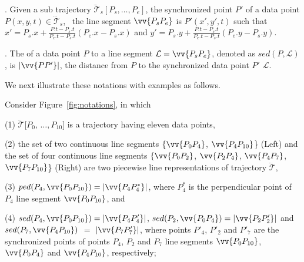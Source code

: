 . Given a sub trajectory $\dddot{\mathcal{T}}_s[P_s, \ldots, P_e]$, the synchronized point $P'$ of a data point  $P(x, y, t) \in \dddot{\mathcal{T}}_s$, ~\wrt the line segment $\vv{P_sP_e}$ is $P'(x', y', t)$ such that $x' = P_s.x +  \frac{P.t-P_s.t}{P_e.t-P_s.t}(P_e.x - P_s.x)$ and $y' = P_s.y +  \frac{P.t-P_s.t}{P_e.t-P_s.t}(P_e.y - P_s.y)$.


. The \sed of a data point $P$ to a line segment $\mathcal{L} = \vv{P_{s}P_{e}}$, denoted as $sed(P, \mathcal{L})$, is $|\vv{PP'}|$, the distance from $P$ to the synchronized data point $P'$ \wrt $\mathcal{L}$. %




We next illustrate these notations with examples as follows.

\begin{example}
\label{exm-notations}
Consider Figure~\ref{fig:notations}, in which

\sstab (1) $\dddot{\mathcal{T}}[P_0$, $\ldots, P_{10}]$ is a trajectory having eleven data points,

\sstab (2) the set of two continuous line segments $\{\vv{P_0P_4}$, $\vv{P_4P_{10}}$\} (Left) and the set of four continuous line segments $\{\vv{P_0P_2}$, $\vv{P_2P_4}$, $\vv{P_4P_7}$, $\vv{P_7P_{10}}$\} (Right) are two piecewise line representations of trajectory $\dddot{\mathcal{T}}$,

\sstab (3) $ped(P_4, \vv{P_0P_{10}})=|\vv{P_4P^*_4}|$, where $P^*_4$ is the perpendicular point of $P_4$ \wrt line segment $\vv{P_0P_{10}}$, and

\sstab (4) $sed(P_4, \vv{P_0P_{10}})= |\vv{P_4P'_4}|$, $sed(P_2, \vv{P_0P_{4}})= |\vv{P_2P'_2}|$ and $sed(P_7, \vv{P_4P_{10}})$ $=$ $|\vv{P_7P'_7}|$, 
where points $P'_4$, $P'_2$ and $P'_7$ are the synchronized points of points $P_4$, $P_2$ and $P_7$ \wrt line segments $\vv{P_0P_{10}}$, $\vv{P_0P_{4}}$ and $\vv{P_4P_{10}}$, respectively;

\end{example}







